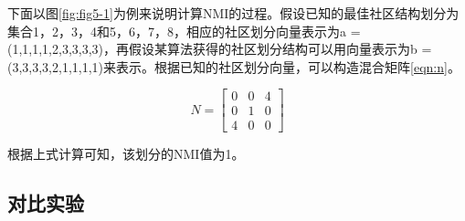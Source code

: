 下面以图\ref{fig:fig5-1}为例来说明计算NMI的过程。假设已知的最佳社区结构划分为集合{1，2，3，4}和{5，6，7，8}，相应的社区划分向量表示为a = (1,1,1,1,2,3,3,3,3)，再假设某算法获得的社区划分结构可以用向量表示为b = (3,3,3,3,2,1,1,1,1)来表示。根据已知的社区划分向量，可以构造混合矩阵\ref{eqn:n}。

\begin{equation}
  \label{eqn:n}
  N=\begin{bmatrix}
    0 & 0 &4 \\ 
    0 & 1 & 0\\ 
    4 & 0 & 0
    \end{bmatrix}
\end{equation}

根据上式计算可知，该划分的NMI值为1。

\subsection{对比实验}
